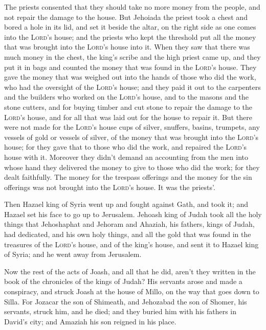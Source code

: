  The priests consented that they should take no more money
from the people, and not repair the damage to the house. 
But Jehoiada the priest took a chest and bored a hole in its lid, and
set it beside the altar, on the right side as one comes into the
\textsc{Lord}'s house; and the priests who kept the threshold put all
the money that was brought into the \textsc{Lord}'s house into it.
 When they saw that there was much money in the chest,
the king's scribe and the high priest came up, and they put it in bags
and counted the money that was found in the \textsc{Lord}'s house.
 They gave the money that was weighed out into the hands
of those who did the work, who had the oversight of the \textsc{Lord}'s
house; and they paid it out to the carpenters and the builders who
worked on the \textsc{Lord}'s house,  and to the masons
and the stone cutters, and for buying timber and cut stone to repair the
damage to the \textsc{Lord}'s house, and for all that was laid out for
the house to repair it.  But there were not made for the
\textsc{Lord}'s house cups of silver, snuffers, basins, trumpets, any
vessels of gold or vessels of silver, of the money that was brought into
the \textsc{Lord}'s house;  for they gave that to those
who did the work, and repaired the \textsc{Lord}'s house with it.
 Moreover they didn't demand an accounting from the men
into whose hand they delivered the money to give to those who did the
work; for they dealt faithfully.  The money for the
trespass offerings and the money for the sin offerings was not brought
into the \textsc{Lord}'s house. It was the priests'.

 Then Hazael king of Syria went up and fought against
Gath, and took it; and Hazael set his face to go up to Jerusalem.
 Jehoash king of Judah took all the holy things that
Jehoshaphat and Jehoram and Ahaziah, his fathers, kings of Judah, had
dedicated, and his own holy things, and all the gold that was found in
the treasures of the \textsc{Lord}'s house, and of the king's house, and
sent it to Hazael king of Syria; and he went away from Jerusalem.

 Now the rest of the acts of Joash, and all that he did,
aren't they written in the book of the chronicles of the kings of Judah?
 His servants arose and made a conspiracy, and struck
Joash at the house of Millo, on the way that goes down to Silla.
 For Jozacar the son of Shimeath, and Jehozabad the son
of Shomer, his servants, struck him, and he died; and they buried him
with his fathers in David's city; and Amaziah his son reigned in his
place.

